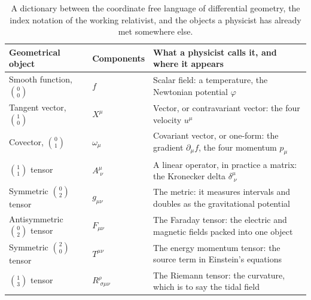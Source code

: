         \begin{table}[ht]
            \centering
            \small
            \begin{tabular}{p{} p{} p{}}
                \hline
                \textbf{Geometrical object} & \textbf{Components} & \textbf{What a physicist calls it, and where it appears}\\
                \hline
                Smooth function, $\binom{0}{0}$ & $f$ & Scalar field: a temperature, the Newtonian potential $\varphi$\\
                Tangent vector, $\binom{1}{0}$ & $X^{\mu}$ & Vector, or contravariant vector: the four velocity $u^{\mu}$\\
                Covector, $\binom{0}{1}$ & $\omega_{\mu}$ & Covariant vector, or one-form: the gradient $\partial_{\mu}f$, the four momentum $p_{\mu}$\\
                $\binom{1}{1}$ tensor & $A^{\mu}_{\;\nu}$ & A linear operator, in practice a matrix: the Kronecker delta $\delta^{\mu}_{\;\nu}$\\
                Symmetric $\binom{0}{2}$ tensor & $g_{\mu\nu}$ & The metric: it measures intervals and doubles as the gravitational potential\\
                Antisymmetric $\binom{0}{2}$ tensor & $F_{\mu\nu}$ & The Faraday tensor: the electric and magnetic fields packed into one object\\
                Symmetric $\binom{2}{0}$ tensor & $T^{\mu\nu}$ & The energy momentum tensor: the source term in Einstein's equations\\
                $\binom{1}{3}$ tensor & $R^{\rho}_{\;\sigma\mu\nu}$ & The Riemann tensor: the curvature, which is to say the tidal field\\
                \hline
            \end{tabular}
            \caption{A dictionary between the coordinate free language of differential geometry, the index notation of the working relativist, and the objects a physicist has already met somewhere else.}
            \label{tab:Dictionary}
        \end{table}


